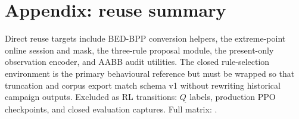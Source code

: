 \section*{Appendix: reuse summary}

Direct reuse targets include BED-BPP conversion helpers, the extreme-point online
session and mask, the three-rule proposal module, the present-only observation
encoder, and AABB audit utilities. The closed rule-selection environment is the
primary behavioural reference but must be wrapped so that truncation and corpus
export match schema v1 without rewriting historical campaign outputs. Excluded
as RL transitions: \(Q_{\hat{}}\) labels, production PPO checkpoints, and closed
evaluation captures. Full matrix:
.
